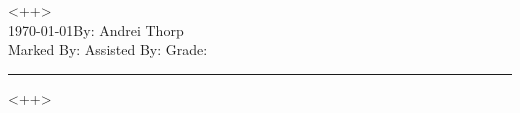 \documentclass[a4paper,12pt]{article}
\newcommand{\HRule}{\rule{\linewidth}{0.5mm}}
\begin{document}
\begin{center}
{ \huge \textsc{ <++>} } \\[0.2cm]
\today \hfill By: Andrei Thorp \\
Marked By: \hfill Assisted By: \hfill Grade:$\qquad\qquad\qquad$
\HRule
\end{center}

<++>
\end{document}
